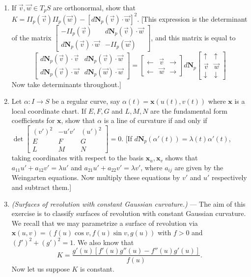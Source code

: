 \documentclass[leqno]{book}
\begin{document}
\begin{enumerate}
\item If $\vec v,\vec w\in T_pS$ are orthonormal, show that $K=I\!I_p(\vec v)I\!I_p(\vec w)-[d\mathbf N_p(\vec v)\cdot\vec w]^2$.  [This expression is the determinant of the matrix $\begin{bmatrix}-I\!I_p(\vec v)&d\mathbf N_p(\vec v)\cdot\vec w\\d\mathbf N_p(\vec v)\cdot\vec w&-I\!I_p(\vec w)\end{bmatrix}$, and this matrix is equal to
$$\begin{bmatrix}d\mathbf N_p(\vec v)\cdot\vec v&d\mathbf N_p(\vec v)\cdot\vec w\\d\mathbf N_p(\vec v)\cdot\vec w&d\mathbf N_p(\vec w)\cdot\vec w\end{bmatrix}=\begin{bmatrix}\leftarrow&\vec v&\rightarrow\\\leftarrow&\vec w&\rightarrow\end{bmatrix}d\mathbf N_p\begin{bmatrix}\uparrow&\uparrow\\\vec v&\vec w\\\downarrow&\downarrow\end{bmatrix}$$
Now take determinants throughout.]

\item Let $\alpha:I\to S$ be a regular curve, say $\alpha(t)=\mathbf x(u(t),v(t))$ where $\mathbf x$ is a local coordinate chart.  If $E,F,G$ and $L,M,N$ are the fundamental form coefficients for $\mathbf x$, show that $\alpha$ is a line of curvature if and only if $\det\begin{bmatrix}(v')^2&-u'v'&(u')^2\\E&F&G\\L&M&N\end{bmatrix}=0$.  [If $d\mathbf N_p(\alpha'(t))=\lambda(t)\alpha'(t)$, taking coordinates with respect to the basis $\mathbf x_u,\mathbf x_v$ shows that $a_{11}u'+a_{12}v'=\lambda u'$ and $a_{21}u'+a_{22}v'=\lambda v'$, where $a_{ij}$ are given by the Weingarten equations.  Now multiply these equations by $v'$ and $u'$ respectively and subtract them.]

\item\emph{(Surfaces of revolution with constant Gaussian curvature.)} \---- The aim of this exercise is to classify surfaces of revolution with constant Gaussian curvature.  We recall that we may parametrize a surface of revolution via $\mathbf x(u,v)=(f(u)\cos v,f(u)\sin v,g(u))$ with $f>0$ and $(f')^2+(g')^2=1$.  We also know that
$$K=\frac{g'(u)[f'(u)g''(u)-f''(u)g'(u)]}{f(u)}.$$
Now let us suppose $K$ is constant.


\end{enumerate}
\end{document}
